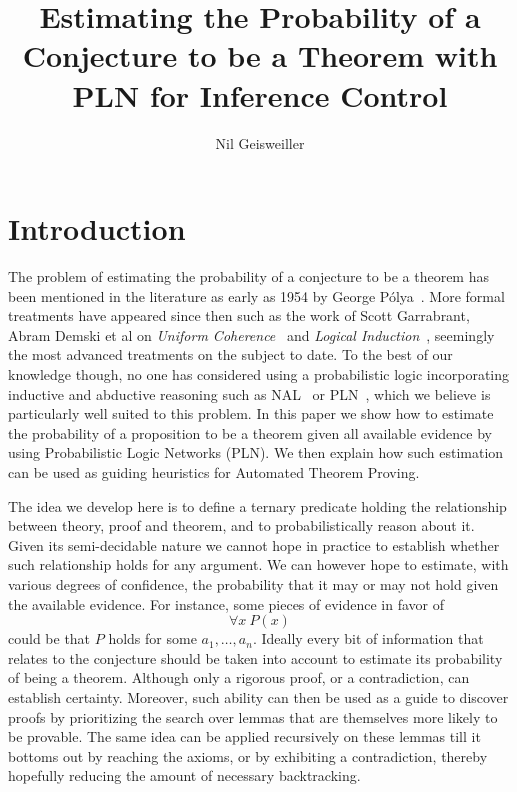 \documentclass{easychair}
\title{Estimating the Probability of a Conjecture to be a Theorem with
  PLN for Inference Control}
\author{Nil Geisweiller}
\institute{
  SingularityNET Foundation,\\
  Zug, Switzerland\\
  \email{nil@singularitynet.io}
}
\begin{document}
\maketitle


\section{Introduction}

The problem of estimating the probability of a conjecture to be a
theorem has been mentioned in the literature as early as 1954 by
George P\'olya~\cite{Polya1954}.  More formal treatments have appeared
since then such as the work of Scott Garrabrant, Abram Demski et al on
\emph{Uniform Coherence}~\cite{Garrabrant2016, Abram2016} and
\emph{Logical Induction}~\cite{GarrabrantBCST16}, seemingly the most
advanced treatments on the subject to date.  To the best of our
knowledge though, no one has considered using a probabilistic logic
incorporating inductive and abductive reasoning such as
NAL~\cite{Wang2013} or PLN~\cite{Goertzel09PLN}, which we believe is
particularly well suited to this problem.  In this paper we show how
to estimate the probability of a proposition to be a theorem given all
available evidence by using Probabilistic Logic Networks (PLN).  We
then explain how such estimation can be used as guiding heuristics for
Automated Theorem Proving.

The idea we develop here is to define a ternary predicate holding the
relationship between theory, proof and theorem, and to
probabilistically reason about it.  Given its semi-decidable nature we
cannot hope in practice to establish whether such relationship holds
for any argument.  We can however hope to estimate, with various
degrees of confidence, the probability that it may or may not hold
given the available evidence.  For instance, some pieces of evidence
in favor of
$$\forall x \ P(x)$$ could be that $P$ holds for some $a_1, \dots,
a_n$.  Ideally every bit of information that relates to the conjecture
should be taken into account to estimate its probability of being a
theorem.  Although only a rigorous proof, or a contradiction, can
establish certainty.  Moreover, such ability can then be used as a
guide to discover proofs by prioritizing the search over lemmas that
are themselves more likely to be provable.  The same idea can be
applied recursively on these lemmas till it bottoms out by reaching
the axioms, or by exhibiting a contradiction, thereby hopefully
reducing the amount of necessary backtracking.
\end{document}
